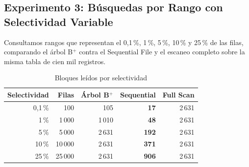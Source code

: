 \documentclass[a4paper,12pt]{article}
\begin{document}
\subsection{Experimento 3: Búsquedas por Rango con Selectividad Variable}

Consultamos rangos que representan el 0{,}1\,\%, 1\,\%, 5\,\%, 10\,\% y 25\,\%
de las filas, comparando el árbol B$^+$ contra el Sequential File y el escaneo
completo sobre la misma tabla de cien mil registros.

\begin{table}[H]
\centering
\caption{Bloques leídos por selectividad}
\begin{tabular}{@{}rrrrr@{}}
\toprule
\textbf{Selectividad} & \textbf{Filas} & \textbf{Árbol B$^+$} & \textbf{Sequential} & \textbf{Full Scan} \\
\midrule
0{,}1\,\% & 100 & 105 & \textbf{17} & 2\,631 \\
1\,\% & 1\,000 & 1\,010 & \textbf{48} & 2\,631 \\
5\,\% & 5\,000 & 2\,631 & \textbf{192} & 2\,631 \\
10\,\% & 10\,000 & 2\,631 & \textbf{371} & 2\,631 \\
25\,\% & 25\,000 & 2\,631 & \textbf{906} & 2\,631 \\
\bottomrule
\end{tabular}
\end{table}
\end{document}

